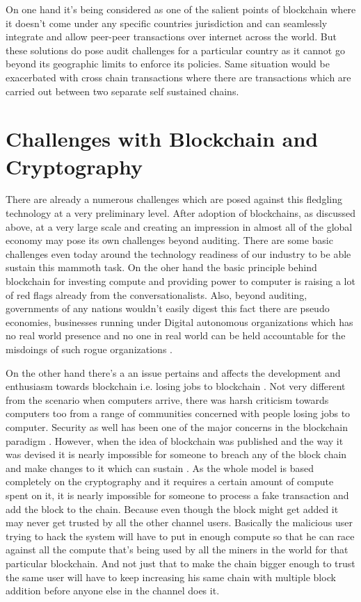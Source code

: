 On one hand it's being considered as one of the salient points of blockchain where it doesn't come under any specific countries jurisdiction and can seamlessly integrate and allow peer-peer transactions over internet across the world. But these solutions do pose audit challenges for a particular country as it cannot go beyond its geographic limits to enforce its policies. Same situation would be exacerbated with cross chain transactions where there are transactions which are carried out between two separate self sustained chains.

\section{Challenges with Blockchain and Cryptography}
There are already a numerous challenges which are posed against this fledgling technology at a very preliminary level. After adoption of blockchains, as discussed above, at a very large scale and creating an impression in almost all of the global economy may pose its own challenges beyond auditing. There are some basic challenges even today around the technology readiness of our industry to be able sustain this mammoth task. On the oher hand the basic principle behind blockchain for investing compute and providing power to computer is raising a lot of red flags already from the conversationalists. Also, beyond auditing, governments of any nations wouldn't easily digest this fact there are pseudo economies, businesses running under Digital autonomous organizations which has no real world presence and no one in real world can be held accountable for the misdoings of such rogue organizations \cite{myungsan33}.

On the other hand there's a an issue pertains and affects the development and enthusiasm towards blockchain i.e. losing jobs to blockchain \cite{michael34}. Not very different from the scenario when computers arrive, there was harsh criticism towards computers too from a range of communities concerned with people losing jobs to computer. Security as well has been one of the major concerns in the blockchain paradigm \cite{mauro35}. However, when the idea of blockchain was published and the way it was devised it is nearly impossible for someone to breach any of the block chain and make changes to it which can sustain \cite{bitcoin12}. As the whole model is based completely on the cryptography and it requires a certain amount of compute spent on it, it is nearly impossible for someone to process a fake transaction and add the block to the chain. Because even though the block might get added it may never get trusted by all the other channel users. Basically the malicious user trying to hack the system will have to put in enough compute so that he can race against all the compute that's being used by all the miners in the world for that particular blockchain. And not just that to make the chain bigger enough to trust the same user will have to keep increasing his same chain with multiple block addition before anyone else in the channel does it.


